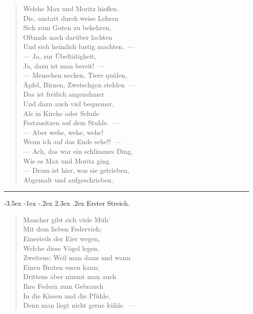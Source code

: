 \documentclass[a4paper,12pt]{article}
\makeatletter
\renewcommand\section{\@startsection {section}{1}{\z@}%
                                   {-3.5ex \@plus -1ex \@minus -.2ex}%
                                   {2.3ex \@plus.2ex}%
                                   {\centering\normalfont\LARGE\bfseries}}
\makeatother
\begin{document}
\begin{verse}
Welche Max und Moritz hießen.\\{}
Die, anstatt durch weise Lehren\\{}
Sich zum Guten zu bekehren,\\{}
Oftmals noch darüber lachten\\{}
Und sich heimlich lustig machten.~—\\{}
— Ja, zur Übeltätigkeit,\\{}
Ja, dazu ist man bereit!~—\\{}
— Menschen necken, Tiere quälen,\\{}
Äpfel, Birnen, Zwetschgen stehlen~—\\{}
Das ist freilich angenehmer\\{}
Und dazu auch viel bequemer,\\{}
Als in Kirche oder Schule\\{}
Festzusitzen auf dem Stuhle.~—\\{}
— Aber wehe, wehe, wehe!\\{}
Wenn ich auf das Ende sehe!!~—\\{}
— Ach, das war ein schlimmes Ding,\\{}
Wie es Max und Moritz ging.\\{}
— Drum ist hier, was sie getrieben,\\{}
Abgemalt und aufgeschrieben.
\end{verse}


\hrule


\clearpage
\section{Erster Streich.\label{Erster_Streich}}


\begin{verse}
Mancher gibt sich viele Müh'\\{}
Mit dem lieben Federvieh;\\{}
Einesteils der Eier wegen,\\{}
Welche diese Vögel legen,\\{}
Zweitens: Weil man dann und wann\\{}
Einen Braten essen kann;\\{}
Drittens aber nimmt man auch\\{}
Ihre Federn zum Gebrauch\\{}
In die Kissen und die Pfühle,\\{}
Denn man liegt nicht gerne kühle.~—
\end{verse}
\end{document}

